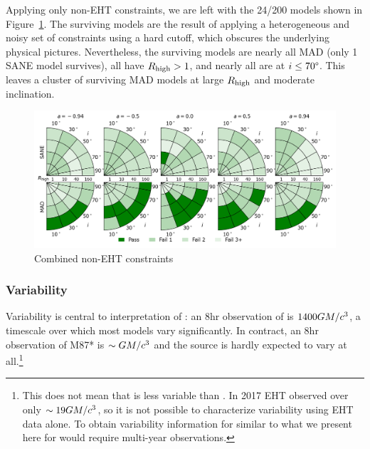 

Applying only non-EHT constraints, we are left with the 24/200 models shown in Figure~\ref{fig:non_eht_cuts}. The surviving models are the result of applying a heterogeneous and noisy set of constraints using a hard cutoff, which obscures the underlying physical pictures.  Nevertheless, the surviving models are nearly all MAD (only 1 SANE model survives), all have $R_\mathrm{high} > 1$, and nearly all are at $i \le 70\degree$.  This leaves a cluster of surviving MAD models at large $R_\mathrm{high}$ and moderate inclination.

\begin{figure}
  \centering
  \includegraphics[width=\textwidth]{./figures/Non_Interferometric_Constraints.png}
  \caption{Combined non-EHT constraints}
  \label{fig:non_eht_cuts}
\end{figure}

\subsubsection{Variability}

Variability is central to interpretation of \sgra: an $8$hr observation of \sgra is $1400 GM/c^3$, a timescale over which most models vary significantly.  In contract, an $8$hr observation of M87* is $\sim GM/c^3$ and the source is hardly expected to vary at all.\footnote{This does not mean that  is less variable than \sgra.  In 2017 EHT observed  over only $\sim 19GM/c^3$, so it is not possible to characterize  variability using EHT data alone.  To obtain variability information for  similar to what we present here for \sgra would require multi-year observations.}

